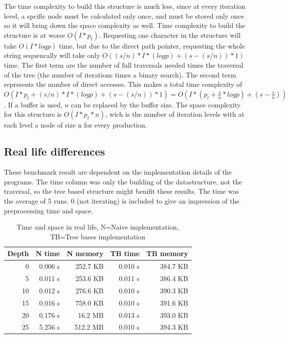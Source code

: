 \documentclass[11pt,a4paper]{article}
\begin{document}
The time complexity to build this structure is much less, since at every iteration level, a spcific node must be calculated only once, and must be stored only once so it will bring down the space complexity as well.
Time complexity to build the structure is at worse $O(I*p_t)$.
Requesting one character in the structure will take $O(I*log p)$ time, but due to the direct path pointer, requesting the whole string sequencally will take only $O((s/n) * I*(log p) + (s-(s/n)) * 1)$ time. The first term are the number of full traversals needed times the traversal of the tree (the number of iterations times a binary search). The second term represents the number of direct accesses. This makes a total time complexity of $O(I*p_t + (s/n) * I*(log p) + (s-(s/n)) * 1) = O(I * (p_t + \frac{s}{n} * log p) + (s - \frac{s}{n}))$. If a buffer is used, $n$ can be replaced by the buffer size.
The space complexity for this structure is $O(I*p_t*n)$, wich is the number of iteration levels with at each level a node of size n for every production.

\subsection{Real life differences} %

These benchmark result are dependent on the implementation details of the programs. The time column was only the building of the datastructure, not the traversal, so the tree based structure might benifit these results. The time was the average of 5 runs. 0 (not iterating) is included to give an impression of the preprocessing time and space.

\begin{table}
\center
\begin{tabular}{r r r r r}
Depth & N time & N memory & TB time & TB memory \\ \hline
0  & 0.006 s & 252.7 KB & 0.010 s & 384.7 KB \\ \hline
5  & 0.011 s & 253.6 KB & 0.011 s & 386.4 KB \\ \hline
10 & 0.012 s & 276.6 KB & 0.010 s & 390.3 KB \\ \hline
15 & 0.016 s & 758.0 KB & 0.010 s & 391.6 KB \\ \hline
20 & 0.176 s &  16.2 MB & 0.013 s & 393.0 KB \\ \hline
25 & 5.256 s & 512.2 MB & 0.010 s & 394.3 KB \\
\end{tabular}
\caption{Time and space in real life, N=Naive implementation, TB=Tree bases implementation}
\end{table}
\end{document}
